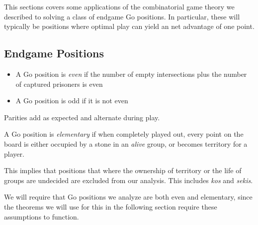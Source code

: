 \documentclass[../math194_paper.tex]{subfiles}
\begin{document}
This sections covers some applications of the combinatorial game theory we 
described to solving a class of endgame Go positions. In particular, these
will typically be positions where optimal play can yield an net advantage 
of one point.

\subsection{Endgame Positions}

\begin{definition} \:
    \begin{itemize}
        \item A Go position is \textit{even} if the number of empty intersections plus the number of 
        captured prisoners is even
        \item A Go position is odd if it is not even
    \end{itemize}
\end{definition}
Parities add as expected and alternate during play.

\begin{definition}
    A Go position is \textit{elementary} if when completely played out, every point on the board 
    is either occupied by a stone in an \textit{alive} group, or becomes territory for a player.
\end{definition}
This implies that positions that where the ownership of territory or the life of groups are undecided
are excluded from our analysis. This includes \textit{kos} and \textit{sekis}.

We will require that Go positions we analyze are both even and elementary,
since the theorems we will use for this in the following section require these assumptions to function.
\end{document}
